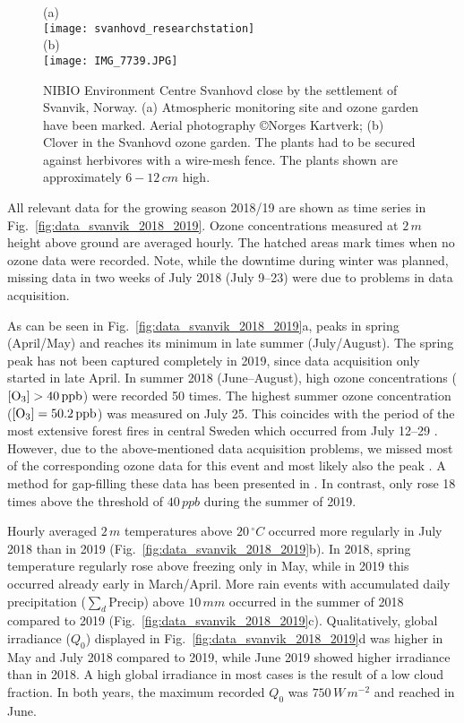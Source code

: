 \documentclass[bg, manuscript]{copernicus}
\begin{document}
\begin{figure}[t]
  \centering
  (a)\\
  \texttt{[image: svanhovd\_researchstation]}\\
  (b)\\
  \texttt{[image: IMG\_7739.JPG]}
  \caption{NIBIO Environment Centre Svanhovd close by the settlement of Svanvik, Norway. (a) Atmospheric monitoring site and ozone garden have been marked. Aerial photography \copyright Norges Kartverk; (b) Clover in the Svanhovd ozone garden. The plants had to be secured against herbivores with a wire-mesh fence. The plants shown are approximately $6-12\,\unit{cm}$ high.}
  \label{fig:svanhovd_research_station}
\end{figure}

All relevant data for the growing season 2018/19 are shown as time series in Fig.~\ref{fig:data_svanvik_2018_2019}. Ozone concentrations measured at $2\,\unit{m}$ height above ground are averaged hourly. The hatched areas mark times when no ozone data were recorded. Note, while the downtime during winter was planned, missing data in two weeks of July 2018 (July 9--23) were due to problems in data acquisition.

As can be seen in Fig.~\ref{fig:data_svanvik_2018_2019}a, \chem{[O_3]} peaks in spring (April/May) and reaches its minimum in late summer (July/August). The spring peak has not been captured completely in 2019, since data acquisition only started in late April. In summer 2018 (June--August), high ozone concentrations ($\chem{[O_3]} > 40\,\unit{ppb}$) were recorded 50 times. The highest summer ozone concentration ($\chem{[O_3]} = 50.2\,\unit{ppb}$) was measured on July 25. This coincides with the period of the most extensive forest fires in central Sweden which occurred from July 12--29 \citep{SOU2019}. However, due to the above-mentioned data acquisition problems, we missed most of the corresponding ozone data for this event and most likely also the peak \chem{[O_3]}. A method for gap-filling these data has been presented in \citet{ACPD:Falk2021}. In contrast, \chem{[O_3]} only rose 18 times above the threshold of $40\,\unit{ppb}$ during the summer of 2019. 

Hourly averaged $2\,\unit{m}$ temperatures above $20\,\unit{^\circ C}$ occurred more regularly in July 2018 than in 2019 (Fig.~\ref{fig:data_svanvik_2018_2019}b). In 2018, spring temperature regularly rose above freezing only in May, while in 2019 this occurred already early in March/April.
More rain events with accumulated daily precipitation ($\sum_d \mathrm{Precip}$) above $10\,\unit{mm}$ occurred in the summer of 2018 compared to 2019 (Fig.~\ref{fig:data_svanvik_2018_2019}c).
Qualitatively, global irradiance ($Q_0$) displayed in Fig.~\ref{fig:data_svanvik_2018_2019}d was higher in May and July 2018 compared to 2019, while June 2019 showed higher irradiance than in 2018. A high global irradiance in most cases is the result of a low cloud fraction. In both years, the maximum recorded $Q_0$ was $750\,\unit{W\,m^{-2}}$ and reached in June.
\end{document}
